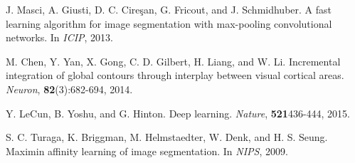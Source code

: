 \documentclass{article} %
\begin{document}
\begin{thebibliography}{9}
{
J. Masci, A. Giusti, D. C. Cire\c{s}an, G. Fricout, and J. Schmidhuber. A fast learning algorithm for image segmentation with max-pooling convolutional networks. In {\it ICIP}, 2013.



M. Chen, Y. Yan, X. Gong, C. D. Gilbert, H. Liang, and W. Li. Incremental integration of global contours through interplay between visual cortical areas. {\it Neuron}, {\bf 82}(3):682-694, 2014.

Y. LeCun, B. Yoshu, and G. Hinton. Deep learning. {\it Nature}, {\bf 521}436-444, 2015.

S. C. Turaga, K. Briggman, M. Helmstaedter, W. Denk, and H. S. Seung. Maximin affinity learning of image segmentation. In {\it NIPS}, 2009.

}
\end{thebibliography}
\endgroup
\end{document}
